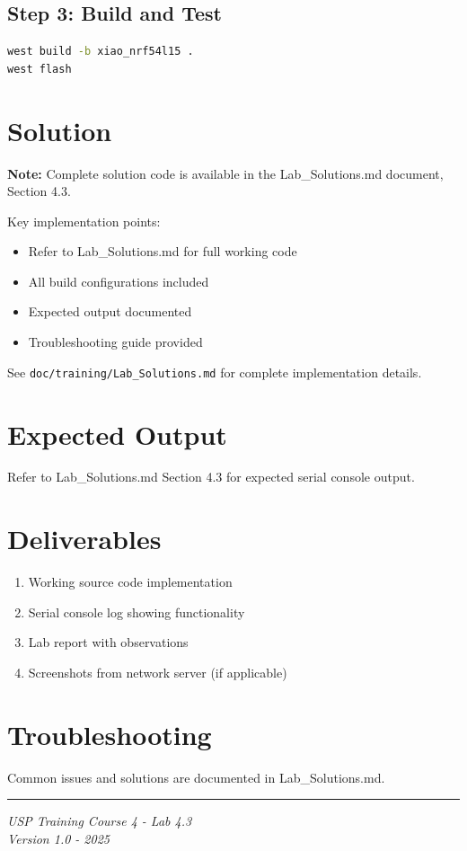 \documentclass[11pt,a4paper]{article}
\begin{document}
\subsection{Step 3: Build and Test}
\begin{lstlisting}[language=bash]
west build -b xiao_nrf54l15 .
west flash
\end{lstlisting}

\section{Solution}

\begin{solutionbox}
\textbf{Note:} Complete solution code is available in the Lab\_Solutions.md document, Section 4.3.

Key implementation points:
\begin{itemize}
    \item Refer to Lab\_Solutions.md for full working code
    \item All build configurations included
    \item Expected output documented
    \item Troubleshooting guide provided
\end{itemize}

See \texttt{doc/training/Lab\_Solutions.md} for complete implementation details.
\end{solutionbox}

\section{Expected Output}

Refer to Lab\_Solutions.md Section 4.3 for expected serial console output.

\section{Deliverables}

\begin{enumerate}[itemsep=10pt]
    \item Working source code implementation
    \item Serial console log showing functionality
    \item Lab report with observations
    \item Screenshots from network server (if applicable)
\end{enumerate}

\section{Troubleshooting}

Common issues and solutions are documented in Lab\_Solutions.md.

\vfill
\noindent\rule{\textwidth}{0.4pt}
\begin{center}
\textit{USP Training Course 4 - Lab 4.3}\\
\textit{Version 1.0 - 2025}
\end{center}
\end{document}
